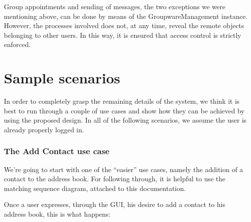 \documentclass[a4paper,10pt]{article}
\begin{document}
Group appointments and sending of messages, the two exceptions we were mentioning
above, can be done by means of the GroupwareManagement instance. However, the processes
involved does not, at any time, reveal the remote objects belonging to other users. In this
way, it is ensured that access control is strictly enforced.

\section{Sample scenarios}

In order to completely grasp the remaining details of the system, we think it is best to run
through a couple of use cases and show how they can be achieved by using the proposed
design. In all of the following scenarios, we assume the user is already properly logged in.

\subsubsection*{The Add Contact use case}

We're going to start with one of the ``easier'' use cases, namely the addition of a contact to
the address book. For following through, it is helpful to use the matching sequence diagram,
attached to this documentation.

Once a user expresses, through the GUI, his desire to add a contact to his address book, this
is what happens:
\end{document}
